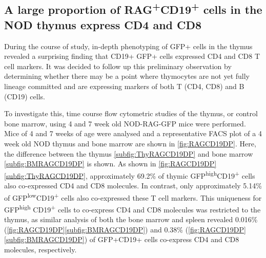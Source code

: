 \subsection{A large proportion of RAG\textsuperscript{+}CD19\textsuperscript{+} cells in the NOD thymus express CD4 and CD8}

During the course of study, in-depth phenotyping of GFP+ cells in the thymus revealed a surprising finding that CD19+ GFP+ cells expressed CD4 and CD8 T cell markers.
It was decided to follow up this preliminary observation by determining whether there may be a point where thymocytes are not yet fully lineage committed and are expressing markers of both T (CD4, CD8) and B (CD19) cells.

To investigate this, time course flow cytometric studies of the thymus, or control bone marrow, using 4 and 7 week old NOD-RAG-GFP mice were performed.
Mice of 4 and 7 weeks of age were analysed and a representative FACS plot of a 4 week old NOD thymus and bone marrow are shown in \cref{fig:RAGCD19DP}. 
Here, the difference between the thymus \cref{subfig:ThyRAGCD19DP} and bone marrow \cref{subfig:BMRAGCD19DP} is shown.
As shown in \cref{fig:RAGCD19DP}\ref{subfig:ThyRAGCD19DP}, approximately 69.2\% of thymic GFP\textsuperscript{high}CD19\textsuperscript{+} cells also co-expressed CD4 and CD8 molecules.
In contrast, only approximately 5.14\% of GFP\textsuperscript{low}CD19\textsuperscript{+} cells also co-expressed these T cell markers.
This uniqueness for GFP\textsuperscript{high} CD19\textsuperscript{+} cells to co-express CD4 and CD8 molecules was restricted to the thymus, as similar analysis of both the bone marrow and spleen revealed 0.016\% (\cref{fig:RAGCD19DP}\ref{subfig:BMRAGCD19DP}) and 0.38\% (\cref{fig:RAGCD19DP}\ref{subfig:BMRAGCD19DP}) of GFP+CD19+ cells co-express CD4 and CD8 molecules, respectively.




